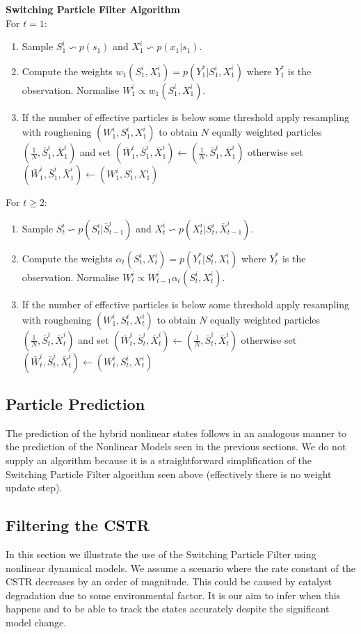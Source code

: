 \textbf{Switching Particle Filter Algorithm}\\
For $t=1$:
\begin{enumerate}
\item
Sample $S^i_1 \backsim p(s_1)$ and $X^i_1 \backsim p(x_1|s_1)$.
\item
Compute the weights $w_1(S_1^i, X_1^i) = p(Y^*_1|S_1^i, X_1^i)$ where $Y^*_1$ is the observation. Normalise $W^i_1 \propto w_1(S_1^i, X_1^i)$. 
\item
If the number of effective particles is below some threshold apply resampling with roughening $(W^i_1, S^i_1, X^i_1)$ to obtain $N$ equally weighted particles $(\frac{1}{N}, \bar{S}^i_1, \bar{X}^i_1)$ and set $(\bar{W}^i_1, \bar{S}^i_1,\bar{X}^i_1) \leftarrow (\frac{1}{N}, \bar{S}^i_1, \bar{X}^i_1)$ otherwise set $(\bar{W}^i_1,\bar{S}^i_1, \bar{X}^i_1) \leftarrow ({W}^i_1, S_1^i, {X}^i_1)$
\end{enumerate}
For $t \geq 2$:
\begin{enumerate}
\item
Sample $S^i_t \backsim p(S_t^i|\bar{S}^i_{t-1})$ and $X^i_t \backsim p(X^i_t|S^i_t, \bar{X}^i_{t-1})$.
\item
Compute the weights $\alpha_t(S_t^i, X_t^i) = p(Y^*_t|S_t^i, X_t^i)$ where $Y^*_t$ is the observation. Normalise $W^i_t \propto W^i_{t-1}\alpha_t(S_t^i, X_t^i)$.
\item
If the number of effective particles is below some threshold apply resampling with roughening $(W^i_1, S^i_t, X^i_t)$ to obtain $N$ equally weighted particles $(\frac{1}{N}, \bar{S}^i_t, \bar{X}^i_t)$ and set $(\bar{W}^i_t, \bar{S}^i_t,\bar{X}^i_t) \leftarrow (\frac{1}{N}, \bar{S}^i_t, \bar{X}^i_t)$ otherwise set $(\bar{W}^i_t,\bar{S}^i_t, \bar{X}^i_t) \leftarrow ({W}^i_t, S_t^i, {X}^i_t)$
\end{enumerate} 

\subsection{Particle Prediction}
The prediction of the hybrid nonlinear states follows in an analogous manner to the prediction of the Nonlinear Models seen in the previous sections. We do not supply an algorithm because it is a straightforward simplification of the Switching Particle Filter algorithm seen above (effectively there is no weight update step).  

\subsection{Filtering the CSTR}
In this section we illustrate the use of the Switching Particle Filter using nonlinear dynamical models. We assume a scenario where the rate constant of the CSTR decreases by an order of magnitude. This could be caused by catalyst degradation due to some environmental factor. It is our aim to infer when this happens and to be able to track the states accurately despite the significant model change. 

